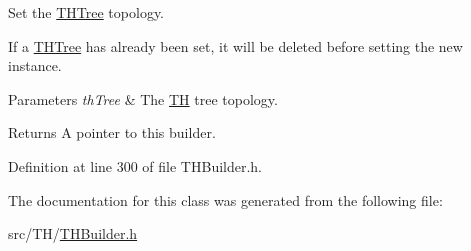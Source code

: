 Set the \hyperlink{classTHTree}{T\+H\+Tree} topology. 

If a \hyperlink{classTHTree}{T\+H\+Tree} has already been set, it will be deleted before setting the new instance.


\begin{DoxyParams}{Parameters}
{\em th\+Tree} & The \hyperlink{classTH}{TH} tree topology. \\
\hline
\end{DoxyParams}
\begin{DoxyReturn}{Returns}
A pointer to this builder. 
\end{DoxyReturn}


Definition at line 300 of file T\+H\+Builder.\+h.



The documentation for this class was generated from the following file\+:\begin{DoxyCompactItemize}
\item 
src/\+T\+H/\hyperlink{THBuilder_8h}{T\+H\+Builder.\+h}\end{DoxyCompactItemize}
